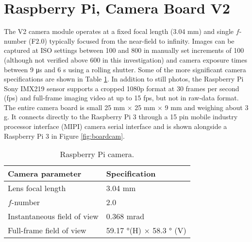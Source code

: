 \section{Raspberry Pi, Camera Board V2}
\label{sec:raspicam}
The V2 camera module operates at a fixed focal length (3.04 \si{\milli\meter})
and single $f$-number (F$2.0$) typically focused from the near-field to
infinity. Images can be captured at ISO settings between 100 and 800 in manually
set increments of 100 (although not verified above 600 in this investigation)
and camera exposure times between 9 \si{\micro\second} and 6 \si{\second} using
a rolling shutter. Some of the more significant camera specifications are shown
in Table \ref{tab:raspicamspec2}. In addition to still photos, the Raspberry Pi
Sony IMX219 sensor supports a cropped 1080p format at 30 frames per second (fps)
and full-frame imaging video at up to 15 fps, but not in raw-data format. The
entire camera board is small 25 \si{\milli\meter} $\times$ 25 \si{\milli\meter}
$\times$ 9 \si{\milli\meter} and weighing about $3$ \si{\gram}. It connects
directly to the Raspberry Pi 3 through a 15 pin mobile industry processor
interface (MIPI) camera serial interface and is shown alongside a Raspberry Pi 3
in Figure \ref{fig:boardcam}.\cite{upton2016raspberry, raspberrycam}
%
\begin{table}[htb]
	\centering
	\caption{Raspberry Pi camera.}
	\label{tab:raspicamspec2}
	\begin{tabular}{l l}
		\hline
		\textbf{Camera parameter}			& 	\textbf{Specification}\\
		\hline
		Lens focal length 	& 	3.04 \si{\milli\meter}	\\
		$f$-number			&	2.0	\\
		Instantaneous field of view	&	0.368 \si{\milli\radian}\\
		Full-frame field of view & 59.17 \si{\degree}(H) $\times$ 58.3 \si{\degree} (V)\\
		\hline
	\end{tabular}
\end{table}
%
